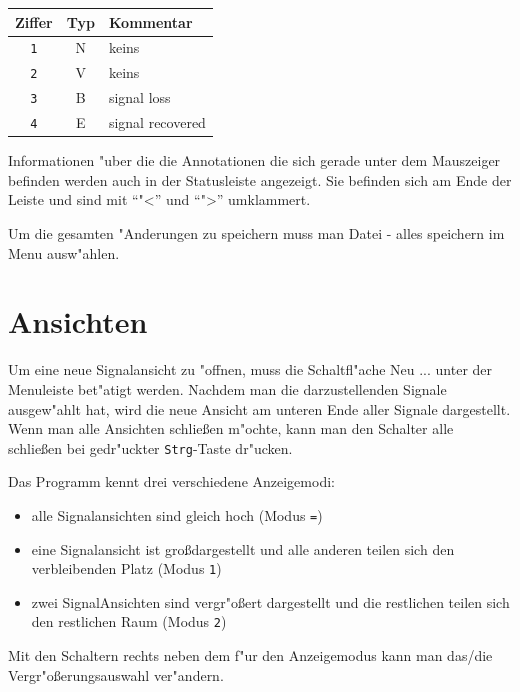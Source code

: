 \noindent
\begin{tabular}{c|c|l}
	\textbf{Ziffer} & \textbf{Typ} & \textbf{Kommentar} \\ \hline
	\verb|1| & N & keins \\
	\verb|2| & V & keins \\
	\verb|3| & B & signal loss\\
	\verb|4| & E & signal recovered\\
\end{tabular}

Informationen "uber die die Annotationen die sich gerade unter dem Mauszeiger befinden werden auch in der Statusleiste angezeigt.
Sie befinden sich am Ende der Leiste und sind mit "`"<"' und "`">"' umklammert.

Um die gesamten "Anderungen zu speichern muss man \textsf{Datei - alles speichern} im Menu ausw"ahlen.

\section{Ansichten}

Um eine neue Signalansicht zu "offnen, muss die Schaltfl"ache \textsf{Neu ...} unter der Menuleiste bet"atigt werden.
Nachdem man die darzustellenden Signale ausgew"ahlt hat, wird die neue Ansicht am unteren Ende aller Signale dargestellt.
Wenn man alle Ansichten schlie\ss en m"ochte, kann man den Schalter \textsf{alle schlie\ss en} bei gedr"uckter \verb|Strg|-Taste dr"ucken.

Das Programm kennt drei verschiedene Anzeigemodi:
\begin{itemize}
	\item alle Signalansichten sind gleich hoch (Modus \verb|=|)
	\item eine Signalansicht ist gro\ss dargestellt und alle anderen teilen sich den verbleibenden Platz (Modus \verb|1|)
	\item zwei SignalAnsichten sind vergr"o\ss ert dargestellt und die restlichen teilen sich den restlichen Raum (Modus \verb|2|)
\end{itemize}
Mit den Schaltern rechts neben dem f"ur den Anzeigemodus kann man das/die Vergr"o\ss erungsauswahl ver"andern.

